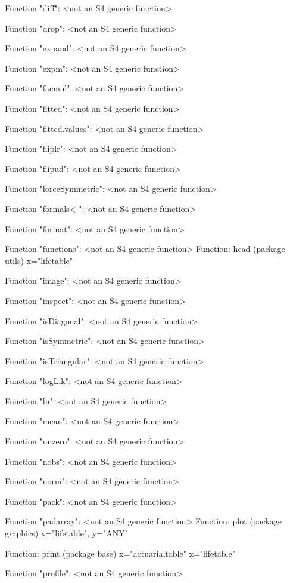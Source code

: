 \documentclass[nojss]{jss}
\begin{document}
\begin{Schunk}
\begin{Soutput}
Function "diff":
 <not an S4 generic function>

Function "drop":
 <not an S4 generic function>

Function "expand":
 <not an S4 generic function>

Function "expm":
 <not an S4 generic function>

Function "facmul":
 <not an S4 generic function>

Function "fitted":
 <not an S4 generic function>

Function "fitted.values":
 <not an S4 generic function>

Function "fliplr":
 <not an S4 generic function>

Function "flipud":
 <not an S4 generic function>

Function "forceSymmetric":
 <not an S4 generic function>

Function "formals<-":
 <not an S4 generic function>

Function "format":
 <not an S4 generic function>

Function "functions":
 <not an S4 generic function>
Function: head (package utils)
x="lifetable"


Function "image":
 <not an S4 generic function>

Function "inspect":
 <not an S4 generic function>

Function "isDiagonal":
 <not an S4 generic function>

Function "isSymmetric":
 <not an S4 generic function>

Function "isTriangular":
 <not an S4 generic function>

Function "logLik":
 <not an S4 generic function>

Function "lu":
 <not an S4 generic function>

Function "mean":
 <not an S4 generic function>

Function "nnzero":
 <not an S4 generic function>

Function "nobs":
 <not an S4 generic function>

Function "norm":
 <not an S4 generic function>

Function "pack":
 <not an S4 generic function>

Function "padarray":
 <not an S4 generic function>
Function: plot (package graphics)
x="lifetable", y="ANY"

Function: print (package base)
x="actuarialtable"
x="lifetable"


Function "profile":
 <not an S4 generic function>


\end{Soutput}
\end{Schunk}
\end{document}
